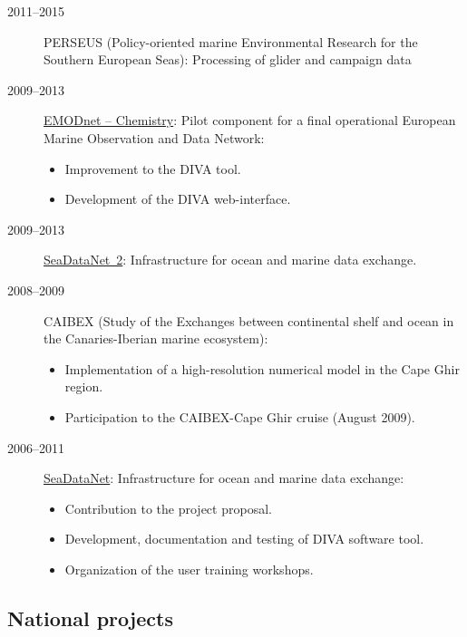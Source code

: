 \documentclass[11pt,a4paper,svgnames]{article}
\begin{document}
\begin{description}
\item[2011--2015] PERSEUS (Policy-oriented marine Environmental Research for the Southern European Seas): Processing of glider and campaign data

\item[2009--2013] \href{https://www.emodnet-chemistry.eu}{EMODnet -- Chemistry}: Pilot component for a final operational European Marine Observation and Data Network:
\begin{itemize}
\item Improvement to the DIVA tool.
\item Development of the DIVA web-interface.
\end{itemize}

\item[2009--2013] \href{https://www.seadatanet.org}{SeaDataNet~2}: Infrastructure for ocean and marine data exchange.

\item[2008--2009] CAIBEX (Study of the Exchanges between continental shelf and ocean in the Canaries-Iberian marine ecosystem):
\begin{itemize}
\item Implementation of a high-resolution numerical model in the Cape Ghir region.
\item Participation to the CAIBEX-Cape Ghir cruise (August 2009).
\end{itemize}

\item[2006--2011] \href{https://www.seadatanet.org}{SeaDataNet}: Infrastructure for ocean and marine data exchange:
\begin{itemize}
\item Contribution to the project proposal.
\item Development, documentation and testing of DIVA software tool.
\item Organization of the user training workshops.
\end{itemize}

\end{description}


\subsection{National projects}
\end{document}
